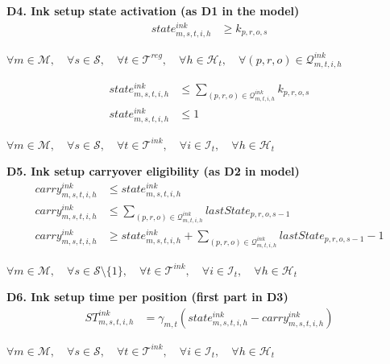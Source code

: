 \documentclass{article}
\begin{document}
\noindent\textbf{D4. Ink setup state activation (as D1 in the model)}
\begin{align}
state^{ink}_{m,s,t,i,h}
&\ge
k_{p,r,o,s}
\label{eq:D4_ink_state_lb}
\end{align}

\begin{center}
$\forall m \in \mathcal{M}, \quad
\forall s \in \mathcal{S}, \quad
\forall t \in \mathcal{T}^{reg}, \quad
\forall h \in \mathcal{H}_t, \quad
\forall (p,r,o) \in \mathcal{Q}^{ink}_{m,t,i,h}$
\end{center}

\begin{align}
state^{ink}_{m,s,t,i,h}
&\le
\sum_{(p,r,o) \in \mathcal{Q}^{ink}_{m,t,i,h}}
k_{p,r,o,s}
\label{eq:D4_ink_state_ub}
\\
state^{ink}_{m,s,t,i,h}
&\le
1
\label{eq:D4_ink_exclusivity}
\end{align}


\begin{center}
$\forall m \in \mathcal{M}, \quad
\forall s \in \mathcal{S}, \quad
\forall t \in \mathcal{T}^{ink}, \quad
\forall i \in \mathcal{I}_t, \quad
\forall h \in \mathcal{H}_t$
\end{center}

\noindent\textbf{D5. Ink setup carryover eligibility (as D2 in model)}
\begin{align}
carry^{ink}_{m,s,t,i,h}
&\le
state^{ink}_{m,s,t,i,h}
\label{eq:D5_ink_carry_current_state}
\\
carry^{ink}_{m,s,t,i,h}
&\le
\sum_{(p,r,o) \in \mathcal{Q}^{ink}_{m,t,i,h}}
lastState_{p,r,o,s-1}
\label{eq:D5_ink_carry_reference_ub}
\\
carry^{ink}_{m,s,t,i,h}
&\ge
state^{ink}_{m,s,t,i,h}
+
\sum_{(p,r,o) \in \mathcal{Q}^{ink}_{m,t,i,h}}
lastState_{p,r,o,s-1}
- 1
\label{eq:D5_ink_carry_reference_lb}
\end{align}
\begin{center}
$\forall m \in \mathcal{M}, \quad
\forall s \in \mathcal{S}\setminus\{1\}, \quad
\forall t \in \mathcal{T}^{ink}, \quad
\forall i \in \mathcal{I}_t, \quad
\forall h \in \mathcal{H}_t$
\end{center}


\noindent\textbf{D6. Ink setup time per position (first part in D3)}
\begin{align}
ST^{ink}_{m,s,t,i,h}
&=
\gamma_{m,t}
\left(
state^{ink}_{m,s,t,i,h}
-
carry^{ink}_{m,s,t,i,h}
\right)
\label{eq:D6_ink_time}
\end{align}
\begin{center}
$\forall m \in \mathcal{M}, \quad
\forall s \in \mathcal{S}, \quad
\forall t \in \mathcal{T}^{ink}, \quad
\forall i \in \mathcal{I}_t, \quad
\forall h \in \mathcal{H}_t$
\end{center}
\end{document}

